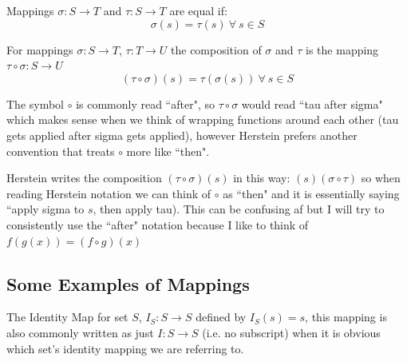 \begin{definition}
Mappings $\sigma : S \rightarrow T$ and $\tau: S \rightarrow T$ are equal if:
\begin{equation}
    \sigma(s)=\tau(s) \ \forall \ s\in S\nonumber
\end{equation}
\end{definition}
\begin{definition}
For mappings $\sigma: S\rightarrow T$, $\tau: T\rightarrow U$ the composition of $\sigma$ and $\tau$
is the mapping $\tau \circ \sigma: S\rightarrow U$
\begin{equation}
    (\tau \circ \sigma)(s) = \tau(\sigma(s)) \ \forall \ s \in S \nonumber
\end{equation}
\end{definition}
\newpage
\begin{notation}
The symbol $\circ$ is commonly read ``after", so $\tau \circ \sigma$ would read ``tau after sigma"
which makes sense when we think of wrapping functions around each other (tau gets applied after
sigma gets applied), however Herstein prefers another convention that treats $\circ$ more like
``then".\steezybreak

\noindent Herstein writes the composition $(\tau \circ \sigma)(s)$ in this way:
$ (s)(\sigma \circ \tau)$ so when reading Herstein notation we can think of $\circ$ as ``then" and
it is essentially saying ``apply sigma to $s$, then apply tau). This can be confusing af but I will
try to consistently use the ``after" notation because I like to think of $f(g(x))=(f\circ g) (x)$
\end{notation}

\subsection{Some Examples of Mappings}
\begin{example}
The Identity Map for set $S$,  $I_S: S\rightarrow S$ defined by $I_S(s)=s$, this mapping is also
commonly written as just $I: S\rightarrow S$ (i.e. no subscript) when it is obvious which set's
identity mapping we are referring to.
\end{example}

